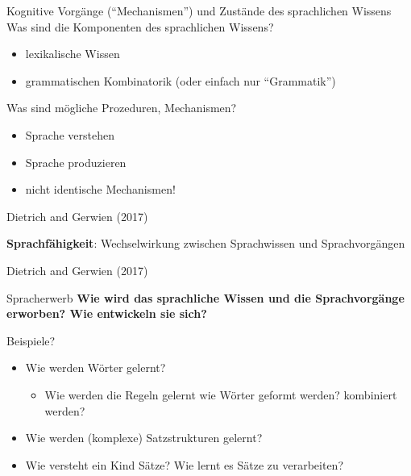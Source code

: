 \documentclass[
  ignorenonframetext,
]{beamer}
\providecommand{\tightlist}{%
  \setlength{\itemsep}{0pt}\setlength{\parskip}{0pt}}
\begin{document}
\begin{frame}
\begin{block}{Kognitive Vorgänge (``Mechanismen'') und Zustände des
sprachlichen Wissens}
\label{kognitive-vorguxe4nge-mechanismen-und-zustuxe4nde-des-sprachlichen-wissens}
Was sind die Komponenten des sprachlichen Wissens?

\begin{itemize}[<+->]
\tightlist
\item
  lexikalische Wissen
\item
  grammatischen Kombinatorik (oder einfach nur ``Grammatik'')
\end{itemize}

Was sind mögliche Prozeduren, Mechanismen?

\begin{itemize}[<+->]
\tightlist
\item
  Sprache verstehen
\item
  Sprache produzieren
\item
  nicht identische Mechanismen!
\end{itemize}

Dietrich and Gerwien (2017)

\end{block}
\end{frame}

\begin{frame}
{\textbf{Sprachfähigkeit}: Wechselwirkung zwischen Sprachwissen und
Sprachvorgängen}

Dietrich and Gerwien (2017)
\end{frame}

\begin{frame}
\begin{block}{Spracherwerb}
\label{spracherwerb}
\textbf{Wie wird das sprachliche Wissen und die Sprachvorgänge erworben?
Wie entwickeln sie sich?}

{Beispiele?}

\begin{itemize}[<+->]
\tightlist
\item
  Wie werden Wörter gelernt?

  \begin{itemize}[<+->]
  \tightlist
  \item
    Wie werden die Regeln gelernt wie Wörter geformt werden? kombiniert
    werden?
  \end{itemize}
\item
  Wie werden (komplexe) Satzstrukturen gelernt?
\item
  Wie versteht ein Kind Sätze? Wie lernt es Sätze zu verarbeiten?
\end{itemize}
\end{block}
\end{frame}
\end{document}

